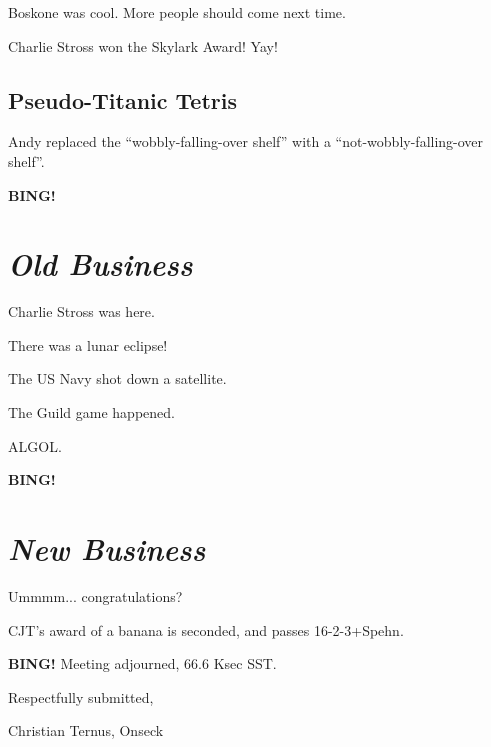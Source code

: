 \documentclass[10pt]{article}
\newcommand{\bing}{{\bf BING!} }
\newcommand{\goto}[1]{\bing \vskip 12pt \section*{{\em{#1}}}}
\begin{document}
Boskone was cool.  More people should come next time.

Charlie Stross won the Skylark Award!  Yay!

\subsection*{Pseudo-Titanic Tetris}

Andy replaced the ``wobbly-falling-over shelf'' with a ``not-wobbly-falling-over shelf''.

\goto{Old Business}

Charlie Stross was here.

There was a lunar eclipse!

The US Navy shot down a satellite.

The Guild game happened.

ALGOL.

\goto{New Business}

Ummmm... congratulations?

CJT's award of a banana is seconded, and passes 16-2-3+Spehn.

\bing
\noindent
Meeting adjourned, 66.6 Ksec SST.

\vspace{18pt}

\centerline{Respectfully submitted,}
\centerline{Christian Ternus, Onseck}
\end{document}
